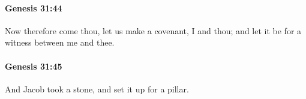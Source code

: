 		\paragraph{Genesis 31:44} %
			\label{GENESIS-31-44}

			Now therefore come thou, let us make a covenant, I and thou; and let it be for a witness between me and thee.


		\paragraph{Genesis 31:45} %
			\label{GENESIS-31-45}

			And Jacob took a stone, and set it up for a pillar.


